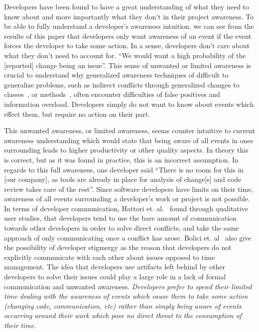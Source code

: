 \documentclass[conference]{IEEEtran}
\begin{document}
Developers have been found to have a great understanding of what they need to know about and more importantly what they don't in
their project awareness. To be able to fully understand a developer's awareness intuition, we can see from the results of this paper that
developers only want awareness of an event if the event forces the developer to take some action. In a sense, developers
don't care about what they don't need to account for. ``We would want a high probability of the [reported] change being an issue''.
This sense of unwanted or limited awareness is crucial to understand why generalized
awareness techniques of difficult to generalize problems, such as indirect conflicts through generalized changes to
classes~\cite{Sarma:2007:TSA}, or methods~\cite{Trainer:2005:BGT,Servant:2010:CPI}, often encounter difficulties of false
positives and information overload.
Developers simply do not want to know about events which effect them, but require no action on their part.

This unwanted awareness, or limited awareness, seems counter intuitive to current awareness understanding which would state that
being aware of all events in ones surrounding leads to higher productivity or other quality aspects. In theory this is correct,
but as it was found in practice, this is an incorrect assumption.
In regards to this full awareness, one developer said ``There is no room for this in [our company], as tools are already in place for
analysis of change[s] and code review takes care of the rest''. Since software developers have limits on their time, awareness of
all events surrounding a developer's work or project is not possible.
In terms of developer communication, Hattori et. al.~\cite{Hattori:2012:ICG} found through qualitative user studies, that developers
tend to use the bare amount of communication
towards other developers in order to solve direct conflicts, and take the same approach of only communicating once a conflict has arose.
Bolici et. al~\cite{Bolici:2009} also give the
possibility of developer stigmergy as the reason that developers do not explicitly communicate with each other about issues opposed to
time management. The idea
that developers use artifacts left behind by other developers to solve their issues could play a large role in a lack of formal communication
and unwanted awareness.
\textit{Developers prefer to spend their limited time dealing with
the awareness of events which cause them to take some action (changing code, communication, etc) rather than simply being aware
of events occurring around their work which pose no direct threat to the consumption of their time.}
\end{document}

